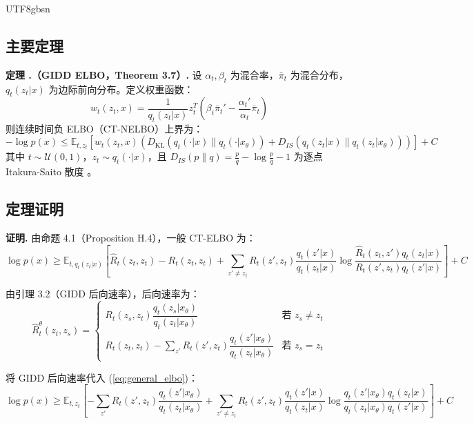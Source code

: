 \documentclass[11pt,a4paper]{article}
\newcounter{theorem}[section]
\renewcommand{\thetheorem}{\thesection.\arabic{theorem}}
\newcommand{\Dkl}{D_{\mathrm{KL}}}
\begin{document}
\begin{CJK}{UTF8}{gbsn}
\subsection{主要定理}

\begin{thmbox}
\textbf{定理 \thetheorem（GIDD ELBO，Theorem 3.7）.}
设 $\alpha_t, \beta_t$ 为混合率，$\bar{\pi}_t$ 为混合分布，$q_t(z_t|x)$ 为边际前向分布。定义权重函数：
\[
w_t(z_t, x) = \frac{1}{q_t(z_t|x)} z_t^T \left(\beta_t \bar{\pi}_t' - \frac{\alpha_t'}{\alpha_t}\bar{\pi}_t\right)
\]
则连续时间负 ELBO（CT-NELBO）上界为：
\[
-\log p(x) \leq \mathbb{E}_{t, z_t}\left[w_t(z_t, x) \left(\Dkl(q_t(\cdot|x) \| q_t(\cdot|x_\theta)) + D_{IS}(q_t(z_t|x) \| q_t(z_t|x_\theta))\right)\right] + C
\]
其中 $t \sim \mathcal{U}(0,1)$，$z_t \sim q_t(\cdot|x)$，且 $D_{IS}(p\|q) = \frac{p}{q} - \log\frac{p}{q} - 1$ 为逐点 Itakura-Saito 散度 。
\end{thmbox}

\subsection{定理证明}

\textbf{证明.} 由命题 4.1（Proposition H.4），一般 CT-ELBO 为：
\begin{equation} \label{eq:general_elbo}
\log p(x) \geq \mathbb{E}_{t, q_t(z_t|x)} \left[\hat{R}_t(z_t, z_t) - R_t(z_t, z_t) + \sum_{z' \neq z_t} R_t(z', z_t) \frac{q_t(z'|x)}{q_t(z_t|x)} \log \frac{\hat{R}_t(z_t, z') q_t(z_t|x)}{R_t(z', z_t) q_t(z'|x)}\right] + C
\end{equation}

由引理 3.2（GIDD 后向速率），后向速率为：
\[
\hat{R}_t^\theta(z_t, z_s) = \begin{cases}
R_t(z_s, z_t) \dfrac{q_t(z_s|x_\theta)}{q_t(z_t|x_\theta)} & \text{若 } z_s \neq z_t \\[10pt]
R_t(z_t, z_t) - \displaystyle\sum_{z'} R_t(z', z_t) \dfrac{q_t(z'|x_\theta)}{q_t(z_t|x_\theta)} & \text{若 } z_s = z_t
\end{cases}
\]

将 GIDD 后向速率代入 (\ref{eq:general_elbo})：
\begin{equation} \label{eq:gidd_elbo_intermediate}
\log p(x) \geq \mathbb{E}_{t, z_t} \left[-\sum_{z'} R_t(z', z_t) \frac{q_t(z'|x_\theta)}{q_t(z_t|x_\theta)} + \sum_{z' \neq z_t} R_t(z', z_t) \frac{q_t(z'|x)}{q_t(z_t|x)} \log \frac{q_t(z'|x_\theta) q_t(z_t|x)}{q_t(z_t|x_\theta) q_t(z'|x)}\right] + C
\end{equation}


\end{CJK}
\end{document}
